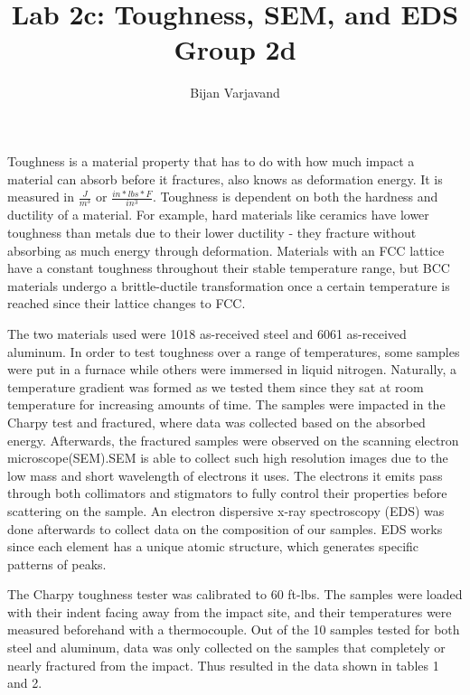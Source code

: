 \documentclass{article}
\author{Bijan Varjavand}
\title{Lab 2c: Toughness, SEM, and EDS\\Group 2d}
\begin{document}
\maketitle

\clearpage

Toughness is a material property that has to do with how much impact a material can absorb before it fractures, also knows as deformation energy. It is measured in $\frac{J}{m^3}$ or $\frac{in*lbs*F}{in^3}$. Toughness is dependent on both the hardness and ductility of a material. For example, hard materials like ceramics have lower toughness than metals due to their lower ductility - they fracture without absorbing as much energy through deformation. Materials with an FCC lattice have a constant toughness throughout their stable temperature range, but BCC materials undergo a brittle-ductile transformation once a certain temperature is reached since their lattice changes to FCC.

The two materials used were 1018 as-received steel and 6061 as-received aluminum. In order to test toughness over a range of temperatures, some samples were put in a furnace while others were immersed in liquid nitrogen. Naturally, a temperature gradient was formed as we tested them since they sat at room temperature for increasing amounts of time. The samples were impacted in the Charpy test and fractured, where data was collected based on the absorbed energy. Afterwards, the fractured samples were observed on the scanning electron microscope(SEM).SEM is able to collect such high resolution images due to the low mass and short wavelength of electrons it uses. The electrons it emits pass through both collimators and stigmators to fully control their properties before scattering on the sample. An electron dispersive x-ray spectroscopy (EDS) was done afterwards to collect data on the composition of our samples. EDS works since each element has a unique atomic structure, which generates specific patterns of peaks.

The Charpy toughness tester was calibrated to 60 ft-lbs. The samples were loaded with their indent facing away from the impact site, and their temperatures were measured beforehand with a thermocouple. Out of the 10 samples tested for both steel and aluminum, data was only collected on the samples that completely or nearly fractured from the impact. Thus resulted in the data shown in tables 1 and 2. 
\end{document}
